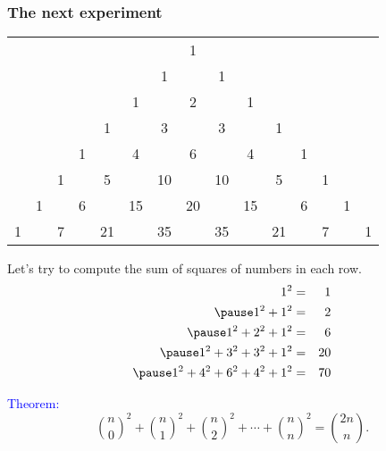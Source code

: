 \begin{frame}\frametitle{The next experiment}
  \begin{tcolorbox}
    {\footnotesize
      \begin{tabular}{ccccccccccccccc}
        & & & & & & & 1 & & & & & & & \\
        & & & & & & 1 & & 1 & & & & & & \\
        & & & & & 1 & & 2 & & 1 & & & & & \\
        & & & & 1 & & 3 & & 3 & & 1 & & & & \\
        & & & 1 & & 4 & & 6 & & 4 & & 1 & & & \\
        & & 1 & & 5 & & 10 & & 10 & & 5 & & 1 & & \\
        & 1 & & 6 & & 15 & & 20 & & 15 & & 6 & & 1 & \\
        1 & & 7 & & 21 & & 35 & & 35 & & 21 & & 7 & & 1 \\
      \end{tabular}
    }
  \end{tcolorbox}

  Let's try to compute the sum of squares of numbers in each row.
  \begin{eqnarray*}
    1^2 &=& 1\\ \pause
    1^2 + 1^2 &=& 2 \\ \pause
    1^2 + 2^2 + 1^2 &=& 6 \\ \pause
    1^2 + 3^2 + 3^2 + 1^2 &=& 20 \\ \pause
    1^2 + 4^2 + 6^2 + 4^2 + 1^2 &=& 70 \\
  \end{eqnarray*}
\end{frame}

\begin{frame}
  \textcolor{blue}{Theorem:}
  \[
  \binom{n}{0}^2 + \binom{n}{1}^2 + \binom{n}{2}^2 + \cdots+ \binom{n}{n}^2
  = \binom{2n}{n}.
  \]
  \vspace{2.5in}
\end{frame}

